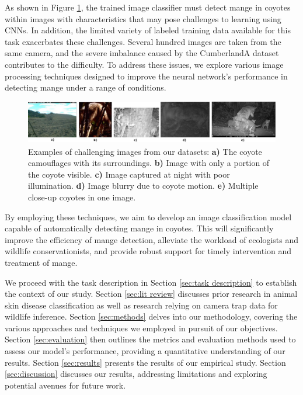\documentclass{article}
\begin{document}
As shown in Figure \ref{fig:fig1}, the trained image classifier must detect mange in coyotes within images with characteristics that may pose challenges to learning using CNNs.
In addition, the limited variety of labeled training data available for this task exacerbates these challenges. Several hundred images are taken from the same camera, and the severe imbalance caused by the CumberlandA dataset contributes to the difficulty. To address these issues, we explore various image processing techniques designed to improve the neural network's performance in detecting mange under a range of conditions.

\begin{figure}[h]
\centering
\includegraphics[width=1.0\textwidth]{fig1.jpeg}
\caption{\label{fig:fig1}Examples of challenging images from our datasets: \textbf{a)} The coyote camouflages with its surroundings. \textbf{b)} Image with only a portion of the coyote visible. \textbf{c)} Image captured at night with poor illumination. \textbf{d)} Image blurry due to coyote motion. \textbf{e)} Multiple close-up coyotes in one image.}
\end{figure}
By employing these techniques, we aim to develop an image classification model capable of automatically detecting mange in coyotes. This will significantly improve the efficiency of mange detection, alleviate the workload of ecologists and wildlife conservationists, and provide robust support for timely intervention and treatment of mange. 

We proceed with the task description in Section
\ref{sec:task description} to
establish the context of our study. Section \ref{sec:lit review} discusses prior research in animal skin disease classification as well as research relying on camera trap data for wildlife inference. Section \ref{sec:methods} delves into our methodology, covering
the various approaches and techniques we employed in pursuit of our objectives. Section \ref{sec:evaluation} then outlines the metrics and evaluation methods used to assess our
model's performance, providing a quantitative understanding of our results. Section \ref{sec:results} presents the results of our empirical study.
Section \ref{sec:discussion} discusses our results, addressing limitations and exploring
potential avenues for future work.
\end{document}
